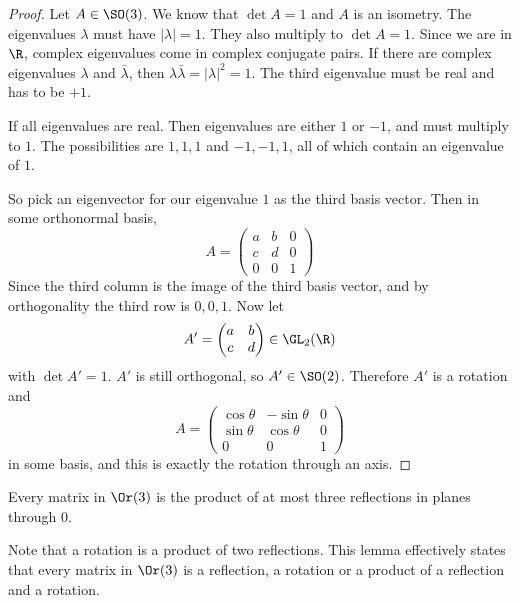 \documentclass[a4paper]{article}
\begin{document}
\begin{proof}
  Let $A\in \SO(3)$. We know that $\det A = 1$ and $A$ is an isometry. The eigenvalues $\lambda$ must have $|\lambda| = 1$. They also multiply to $\det A = 1$. Since we are in $\R$, complex eigenvalues come in complex conjugate pairs. If there are complex eigenvalues $\lambda$ and $\bar\lambda$, then $\lambda\bar\lambda = |\lambda|^2 = 1$. The third eigenvalue must be real and has to be $+1$.

  If all eigenvalues are real. Then eigenvalues are either $1$ or $-1$, and must multiply to $1$. The possibilities are $1, 1, 1$ and $-1, -1, 1$, all of which contain an eigenvalue of $1$.

  So pick an eigenvector for our eigenvalue $1$ as the third basis vector. Then in some orthonormal basis,
  \[
    A = \begin{pmatrix}
      a & b & 0\\
      c & d & 0\\
      0 & 0 & 1
    \end{pmatrix}
  \]
  Since the third column is the image of the third basis vector, and by orthogonality the third row is $0, 0, 1$. Now let
  \[A' = \begin{pmatrix}
      a & b\\
      c & d
    \end{pmatrix} \in \GL_2(\R)
  \]
  with $\det A' = 1$. $A'$ is still orthogonal, so $A'\in \SO(2)$. Therefore $A'$ is a rotation and
  \[
    A =
    \begin{pmatrix}
      \cos\theta & -\sin\theta & 0\\
      \sin\theta & \cos\theta & 0\\
      0 & 0 & 1
    \end{pmatrix}
  \]
  in some basis, and this is exactly the rotation through an axis.
\end{proof}

\begin{lemma}
  Every matrix in $\Or(3)$ is the product of at most three reflections in planes through 0.
\end{lemma}
Note that a rotation is a product of two reflections. This lemma effectively states that every matrix in $\Or(3)$ is a reflection, a rotation or a product of a reflection and a rotation.
\end{document}

